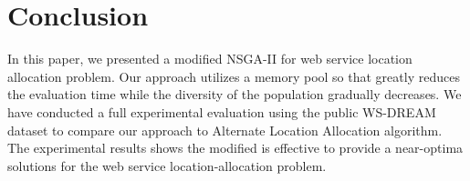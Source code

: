 \documentclass[twoside]{article}
\begin{document}
\section{Conclusion}
In this paper, we presented a modified NSGA-II for web service location allocation problem. Our approach utilizes a memory pool so that
greatly reduces the evaluation time while the diversity of the population gradually decreases. We have conducted a full experimental evaluation using the public WS-DREAM dataset to compare our approach to Alternate Location Allocation algorithm. 
The experimental results shows the modified is effective to provide a near-optima solutions for the web service location-allocation problem.



\end{document}
